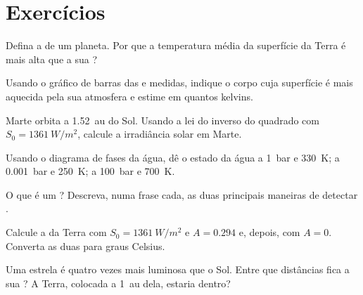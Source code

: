 \section{Exercícios}

\begin{exercise}[$\star$]\label{exo:g10:habitable-planet:1}
Defina a  de um planeta. Por que a temperatura
média da superfície da Terra é mais alta que a sua ?
\end{exercise}

\begin{exercise}[$\star$]\label{exo:g10:habitable-planet:2}
Usando o gráfico de barras das  e medidas, indique
o corpo cuja superfície é mais aquecida pela sua atmosfera e estime em
quantos kelvins.
\end{exercise}

\begin{exercise}[$\star$]\label{exo:g10:habitable-planet:3}
Marte orbita a \qty{1.52}{au} do Sol. Usando a lei do inverso do quadrado
com $S_0 = \qty{1361}{W/m^2}$, calcule a irradiância solar em Marte.
\end{exercise}

\begin{exercise}[$\star$]\label{exo:g10:habitable-planet:4}
Usando o diagrama de fases da água, dê o estado da água a \qty{1}{bar} e
\qty{330}{K}; a \qty{0.001}{bar} e \qty{250}{K}; a \qty{100}{bar} e
\qty{700}{K}.
\end{exercise}

\begin{exercise}[$\star$]\label{exo:g10:habitable-planet:5}
O que é um ? Descreva, numa frase cada, as duas principais
maneiras de detectar .
\end{exercise}

\begin{exercise}[$\star\star$]\label{exo:g10:habitable-planet:6}
Calcule a  da Terra com $S_0 = \qty{1361}{W/m^2}$
e $A = 0.294$ e, depois, com $A = 0$. Converta as duas para graus Celsius.
\end{exercise}

\begin{exercise}[$\star\star$]\label{exo:g10:habitable-planet:7}
Uma estrela é quatro vezes mais luminosa que o Sol. Entre que distâncias
fica a sua ? A Terra, colocada a \qty{1}{au} dela, estaria
dentro?
\end{exercise}

